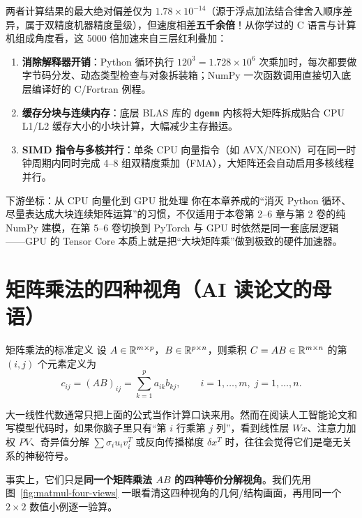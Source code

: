 两者计算结果的最大绝对偏差仅为 $1.78 \times 10^{-14}$（源于浮点加法结合律舍入顺序差异，属于双精度机器精度量级），但速度相差\textbf{五千余倍}！从你学过的 C 语言与计算机组成角度看，这 5000 倍加速来自三层红利叠加：
\begin{enumerate}
  \item \textbf{消除解释器开销}：Python 循环执行 $120^3 = 1.728 \times 10^6$ 次乘加时，每次都要做字节码分发、动态类型检查与对象拆装箱；NumPy 一次函数调用直接切入底层编译好的 C/Fortran 例程。
  \item \textbf{缓存分块与连续内存}：底层 BLAS 库的 \texttt{dgemm} 内核将大矩阵拆成贴合 CPU L1/L2 缓存大小的小块计算，大幅减少主存搬运。
  \item \textbf{SIMD 指令与多核并行}：单条 CPU 向量指令（如 AVX/NEON）可在同一时钟周期内同时完成 4--8 组双精度乘加（FMA），大矩阵还会自动启用多核线程并行。
\end{enumerate}

\begin{insightBox}{下游坐标：从 CPU 向量化到 GPU 批处理}
你在本章养成的“消灭 Python 循环、尽量表达成大块连续矩阵运算”的习惯，不仅适用于本卷第 2--6 章与第 2 卷的纯 NumPy 建模，在第 5--6 卷切换到 PyTorch 与 GPU 时依然是同一套底层逻辑——GPU 的 Tensor Core 本质上就是把“大块矩阵乘”做到极致的硬件加速器。
\end{insightBox}

\section{矩阵乘法的四种视角（AI 读论文的母语）}\label{sec:matmul-four-views}

\begin{recallBox}{矩阵乘法的标准定义}
设 $A \in \mathbb{R}^{m \times p}$，$B \in \mathbb{R}^{p \times n}$，则乘积 $C = AB \in \mathbb{R}^{m \times n}$ 的第 $(i, j)$ 个元素定义为
\[
c_{ij} = (AB)_{ij} = \sum_{k=1}^{p} a_{ik} b_{kj}, \qquad i=1,\dots,m,\; j=1,\dots,n.
\]
\end{recallBox}

大一线性代数通常只把上面的公式当作计算口诀来用。然而在阅读人工智能论文和写模型代码时，如果你脑子里只有“第 $i$ 行乘第 $j$ 列”，看到线性层 $Wx$、注意力加权 $PV$、奇异值分解 $\sum \sigma_i u_i v_i^T$ 或反向传播梯度 $\delta x^T$ 时，往往会觉得它们是毫无关系的神秘符号。

事实上，它们只是\textbf{同一个矩阵乘法 $AB$ 的四种等价分解视角}。我们先用图~\ref{fig:matmul-four-views} 一眼看清这四种视角的几何/结构画面，再用同一个 $2 \times 2$ 数值小例逐一验算。


